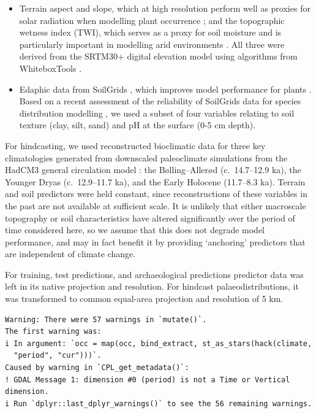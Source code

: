 \documentclass[
  authoryear,
  preprint]{elsarticle}
\providecommand{\tightlist}{%
  \setlength{\itemsep}{0pt}\setlength{\parskip}{0pt}}\usepackage{longtable,booktabs,array}
\begin{document}
\begin{itemize}
\tightlist
\item
  Terrain aspect and slope, which at high resolution perform well as
  proxies for solar radiation when modelling plant occurrence
  \citep{AustinVanNiel2011, LeempoelEtAl2015}; and the topographic
  wetness index (TWI), which serves as a proxy for soil moisture and is
  particularly important in modelling arid environments
  \citep{KopeckyCizkova2010, CamposEtAl2016, DiVirgilioEtAl2018}. All
  three were derived from the SRTM30+ digital elevation model using
  algorithms from WhiteboxTools \citep{Lindsay2016}.
\end{itemize}

\begin{itemize}
\tightlist
\item
  Edaphic data from SoilGrids \citep{HenglEtAl2014, HenglEtAl2017},
  which improves model performance for plants
  \citep{DubuisEtAl2013, ModEtAl2016, VelazcoEtAl2017}. Based on a
  recent assessment of the reliability of SoilGrids data for species
  distribution modelling \citep{MillerEtAl2024}, we used a subset of
  four variables relating to soil texture (clay, silt, sand) and pH at
  the surface (0-5 cm depth).
\end{itemize}

For hindcasting, we used reconstructed bioclimatic data for three key
climatologies generated from downscaled paleoclimate simulations from
the HadCM3 general circulation model
\citep{FordhamEtAl2017, BrownEtAl2018}: the Bølling--Allerød
(c.~14.7--12.9 ka), the Younger Dryas (c.~12.9--11.7 ka), and the Early
Holocene (11.7--8.3 ka). Terrain and soil predictors were held constant,
since reconstructions of these variables in the past are not available
at sufficient scale. It is unlikely that either macroscale topography or
soil characteristics have altered significantly over the period of time
considered here, so we assume that this does not degrade model
performance, and may in fact benefit it by providing `anchoring'
predictors that are independent of climate change.

For training, test predictions, and archaeological predictions predictor
data was left in its native projection and resolution. For hindcast
palaeodistributions, it was transformed to common equal-area projection
and resolution of 5 km.

\begin{verbatim}
Warning: There were 57 warnings in `mutate()`.
The first warning was:
i In argument: `occ = map(occ, bind_extract, st_as_stars(hack(climate,
  "period", "cur")))`.
Caused by warning in `CPL_get_metadata()`:
! GDAL Message 1: dimension #0 (period) is not a Time or Vertical dimension.
i Run `dplyr::last_dplyr_warnings()` to see the 56 remaining warnings.
\end{verbatim}
\end{document}
